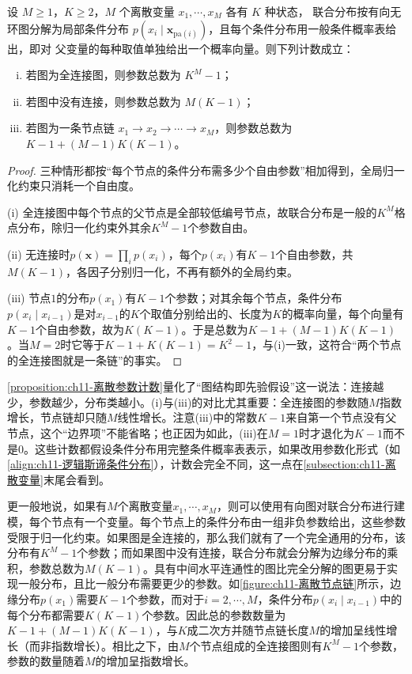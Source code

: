 \documentclass[../../main.tex]{subfiles}
\begin{document}
\begin{proposition}[离散图模型的参数计数]\label{proposition:ch11-离散参数计数}
设 $M\geqslant1$，$K\geqslant2$，$M$ 个离散变量 $x_1,\cdots,x_M$ 各有 $K$ 种状态，
联合分布按有向无环图分解为局部条件分布
$p(x_i\mid \mathbf{x}_{\mathrm{pa}(i)})$，且每个条件分布用一般条件概率表给出，即对
父变量的每种取值单独给出一个概率向量。则下列计数成立：
\begin{enumerate}[(i)]
  \item 若图为全连接图，则参数总数为 $K^M-1$；
  \item 若图中没有连接，则参数总数为 $M(K-1)$；
  \item 若图为一条节点链 $x_1\to x_2\to\cdots\to x_M$，则参数总数为
        $K-1+(M-1)K(K-1)$。
\end{enumerate}
\end{proposition}

\begin{proof}
三种情形都按“每个节点的条件分布需多少个自由参数”相加得到，全局归一化约束只消耗一个自由度。

(i) 全连接图中每个节点的父节点是全部较低编号节点，故联合分布是一般的$K^M$格点分布，除归一化约束外其余$K^M-1$个参数自由。

(ii) 无连接时$p(\mathbf{x})=\prod_i p(x_i)$，每个$p(x_i)$有$K-1$个自由参数，共$M(K-1)$，各因子分别归一化，不再有额外的全局约束。

(iii) 节点$1$的分布$p(x_1)$有$K-1$个参数；对其余每个节点，条件分布$p(x_i\mid x_{i-1})$是对$x_{i-1}$的$K$个取值分别给出的、长度为$K$的概率向量，每个向量有$K-1$个自由参数，故为$K(K-1)$。于是总数为$K-1+(M-1)K(K-1)$。当$M=2$时它等于$K-1+K(K-1)=K^2-1$，与(i)一致，这符合“两个节点的全连接图就是一条链”的事实。
\end{proof}

\begin{remark}
\cref{proposition:ch11-离散参数计数}量化了“图结构即先验假设”这一说法：连接越少，参数越少，分布类越小。(i)与(iii)的对比尤其重要：全连接图的参数随$M$指数增长，节点链却只随$M$线性增长。注意(iii)中的常数$K-1$来自第一个节点没有父节点，这个“边界项”不能省略；也正因为如此，(iii)在$M=1$时才退化为$K-1$而不是$0$。这些计数都假设条件分布用完整条件概率表表示，如果改用参数化形式（如\eqref{align:ch11-逻辑斯谛条件分布}），计数会完全不同，这一点在\cref{subsection:ch11-离散变量}末尾会看到。
\end{remark}

更一般地说，如果有$M$个离散变量$x_1,\cdots,x_M$，则可以使用有向图对联合分布进行建模，每个节点有一个变量。每个节点上的条件分布由一组非负参数给出，这些参数受限于归一化约束。如果图是全连接的，那么我们就有了一个完全通用的分布，该分布有$K^M-1$个参数；而如果图中没有连接，联合分布就会分解为边缘分布的乘积，参数总数为$M(K-1)$。具有中间水平连通性的图比完全分解的图更易于实现一般分布，且比一般分布需要更少的参数。如\cref{figure:ch11-离散节点链}所示，边缘分布$p(x_1)$需要$K-1$个参数，而对于$i=2,\cdots,M$，条件分布$p(x_i\mid x_{i-1})$中的每个分布都需要$K(K-1)$个参数。因此总的参数数量为$K-1+(M-1)K(K-1)$，与$K$成二次方并随节点链长度$M$的增加呈线性增长（而非指数增长）。相比之下，由$M$个节点组成的全连接图则有$K^M-1$个参数，参数的数量随着$M$的增加呈指数增长。
\end{document}
